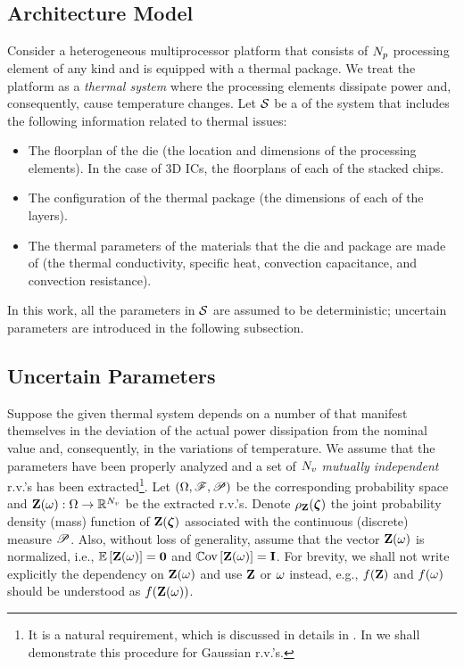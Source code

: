 \subsection{Architecture Model} 
Consider a heterogeneous multiprocessor platform that consists of ${N_p}$ processing element of any kind and is equipped with a thermal package. We treat the platform as a \emph{thermal system} where the processing elements dissipate power and, consequently, cause temperature changes. Let $\mathcal{S}$ be a  of the system that includes the following information related to thermal issues:
\begin{itemize}
  \item The floorplan of the die (the location and dimensions of the processing elements). In the case of 3D ICs, the floorplans of each of the stacked chips.
  \item The configuration of the thermal package (the dimensions of each of the layers).
  \item The thermal parameters of the materials that the die and package are made of (the thermal conductivity, specific heat, convection capacitance, and convection resistance).
\end{itemize}

In this work, all the parameters in $\mathcal{S}$ are assumed to be deterministic; uncertain parameters are introduced in the following subsection.

\subsection{Uncertain Parameters} 
Suppose the given thermal system depends on a number of  that manifest themselves in the deviation of the actual power dissipation from the nominal value and, consequently, in the variations of temperature. We assume that the parameters have been properly analyzed and a set of ${N_v}$ \emph{mutually independent} r.v.'s has been extracted\footnote{It is a natural requirement, which is discussed in details in \cite{xiu2010}. In  we shall demonstrate this procedure for Gaussian r.v.'s.}. Let $(\Omega, \mathscr{F}, \mathscr{P})$ be the corresponding probability space and $\mathbf{Z}(\omega): \Omega \to \mathbb{R}^{N_v}$ be the extracted r.v.'s. Denote $\rho_{\mathbf{Z}}(\boldsymbol{\zeta})$ the joint probability density (mass) function of $\mathbf{Z}(\boldsymbol{\zeta})$ associated with the continuous (discrete) measure $\mathscr{P}$. Also, without loss of generality, assume that the vector $\mathbf{Z}(\omega)$ is normalized, i.e., $\oExp{\vZ(\o)} = \mZero$ and $\oCov{\vZ(\o)} = \mI$. For brevity, we shall not write explicitly the dependency on $\mathbf{Z}(\omega)$ and use $\mathbf{Z}$ or $\omega$ instead, e.g., $f(\mathbf{Z})$ and $f(\omega)$ should be understood as $f(\mathbf{Z}(\omega))$.


